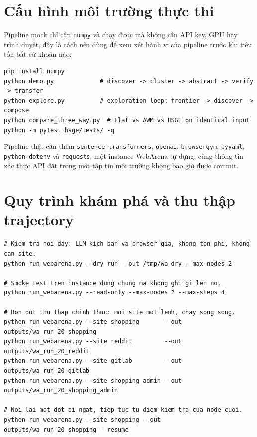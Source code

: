 \section{Cấu hình môi trường thực thi}
\label{app:repro-env}

Pipeline mock chỉ cần \texttt{numpy} và chạy được mà không cần API key, GPU hay
trình duyệt, đây là cách nên dùng để xem xét hành vi của pipeline trước khi
tiêu tốn bất cứ khoản nào:

\begin{lstlisting}[style=mystyle,numbers=none,basicstyle=\scriptsize\ttfamily]
pip install numpy
python demo.py             # discover -> cluster -> abstract -> verify -> transfer
python explore.py          # exploration loop: frontier -> discover -> compose
python compare_three_way.py  # Flat vs AWM vs HSGE on identical input
python -m pytest hsge/tests/ -q
\end{lstlisting}

\noindent
Pipeline thật cần thêm \texttt{sentence-transformers}, \texttt{openai},
\texttt{browsergym}, \texttt{pyyaml}, \texttt{python-dotenv} và
\texttt{requests}, một instance WebArena tự dựng, cùng thông tin xác thực API
đặt trong một tập tin môi trường không bao giờ được commit.

\section{Quy trình khám phá và thu thập trajectory}
\label{app:repro-collect}

\begin{lstlisting}[style=mystyle,numbers=none,basicstyle=\scriptsize\ttfamily]
# Kiem tra noi day: LLM kich ban va browser gia, khong ton phi, khong can site.
python run_webarena.py --dry-run --out /tmp/wa_dry --max-nodes 2

# Smoke test tren instance dung chung ma khong ghi gi len no.
python run_webarena.py --read-only --max-nodes 2 --max-steps 4

# Bon dot thu thap chinh thuc: moi site mot lenh, chay song song.
python run_webarena.py --site shopping       --out outputs/wa_run_20_shopping
python run_webarena.py --site reddit         --out outputs/wa_run_20_reddit
python run_webarena.py --site gitlab         --out outputs/wa_run_20_gitlab
python run_webarena.py --site shopping_admin --out outputs/wa_run_20_shopping_admin

# Noi lai mot dot bi ngat, tiep tuc tu diem kiem tra cua node cuoi.
python run_webarena.py --site shopping --out outputs/wa_run_20_shopping --resume
\end{lstlisting}


